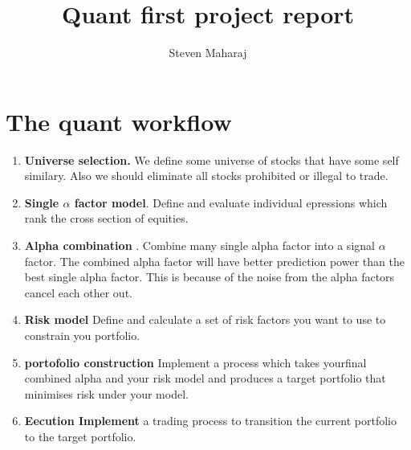 \documentclass[10pt,a4paper]{article}
\author{Steven Maharaj}
\title{Quant first project report}
\begin{document}
\maketitle

\section{The quant workflow}
\begin{enumerate}
\item \textbf{Universe selection.} We define some universe of stocks that have some self similary. Also we should eliminate all stocks prohibited or illegal to trade.

\item \textbf{Single $\alpha$ factor model}. Define and evaluate individual epressions which rank the cross section of equities. 

\item \textbf{Alpha combination	}. Combine many single alpha factor into a signal $\alpha$ factor.  The combined alpha factor will have better prediction power than the best single alpha factor. This is because of the noise from the alpha factors cancel each other out.

\item \textbf{Risk model} Define and calculate a set of risk factors you want to use to constrain you portfolio.

\item \textbf{portofolio construction} Implement a process which takes yourfinal combined alpha and your risk model and produces a target portfolio that minimises risk under your model.

\item \textbf{Eecution Implement} a trading process to transition the current portfolio to the target portfolio.
\end{enumerate}
\end{document}

